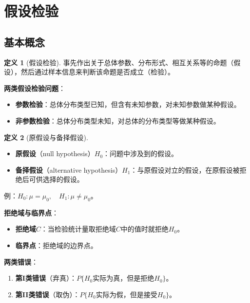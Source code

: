 \documentclass[11pt,a4paper]{report}
\theoremstyle{definition}
\newtheorem{definition}{定义}[chapter]
\theoremstyle{plain}
\begin{document}
\section{假设检验}

\subsection{基本概念}

\begin{definition}[假设检验]
事先作出关于总体参数、分布形式、相互关系等的命题（假设），然后通过样本信息来判断该命题是否成立（检验）。
\end{definition}

\textbf{两类假设检验问题}：
\begin{itemize}[leftmargin=2em]
    \item \textbf{参数检验}：总体分布类型已知，但含有未知参数，对未知参数做某种假设。
    \item \textbf{非参数检验}：总体分布类型未知，对总体的分布类型等做某种假设。
\end{itemize}

\begin{definition}[原假设与备择假设]
\begin{itemize}[leftmargin=2em]
    \item \textbf{原假设}（null hypothesis）$H_0$：问题中涉及到的假设。
    \item \textbf{备择假设}（alternative hypothesis）$H_1$：与原假设对立的假设，在原假设被拒绝后可供选择的假设。
\end{itemize}
例：$H_0:\mu=\mu_0,\quad H_1:\mu\neq\mu_0$。
\end{definition}

\textbf{拒绝域与临界点}：
\begin{itemize}[leftmargin=2em]
    \item \textbf{拒绝域}$C$：当检验统计量取拒绝域$C$中的值时就拒绝$H_0$。
    \item \textbf{临界点}：拒绝域的边界点。
\end{itemize}

\textbf{两类错误}：
\begin{enumerate}[label=\arabic*.,leftmargin=2em]
    \item \textbf{第I类错误}（弃真）：$P\{H_0\text{实际为真，但是拒绝}H_0\}$。
    \item \textbf{第II类错误}（取伪）：$P\{H_0\text{实际为假，但是接受}H_0\}$。
\end{enumerate}
\end{document}
